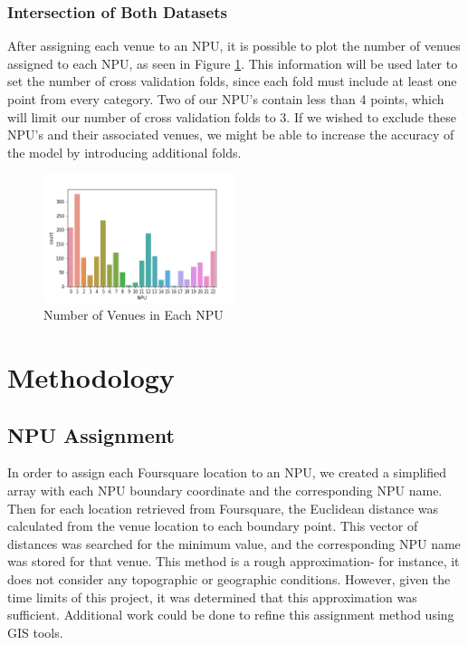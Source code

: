 \documentclass[11pt]{amsart}
\begin{document}
\subsubsection{Intersection of Both Datasets}
After assigning each venue to an NPU, it is possible to plot the number of venues assigned to each NPU, as seen in Figure \ref{fig:npucounts}. This information will be used later to set the number of cross validation folds, since each fold must include at least one point from every category. Two of our NPU's contain less than 4 points, which will limit our number of cross validation folds to 3. If we wished to exclude these NPU's and their associated venues, we might be able to increase the accuracy of the model by introducing additional folds. 

\begin{figure}
\includegraphics[width=0.5\textwidth]{NPUcounts}
\caption{Number of Venues in Each NPU}
\label{fig:npucounts}
\end{figure}
\section{Methodology}
\subsection{NPU Assignment}
In order to assign each Foursquare location to an NPU, we created a simplified array with each NPU boundary coordinate and the corresponding NPU name. Then for each location retrieved from Foursquare, the Euclidean distance was calculated from the venue location to each boundary point. This vector of distances was searched for the minimum value, and the corresponding NPU name was stored for that venue. 
This method is a rough approximation- for instance, it does not consider any topographic or geographic conditions. However, given the time limits of this project, it was determined that this approximation was sufficient. Additional work could be done to refine this assignment method using GIS tools.
\end{document}
